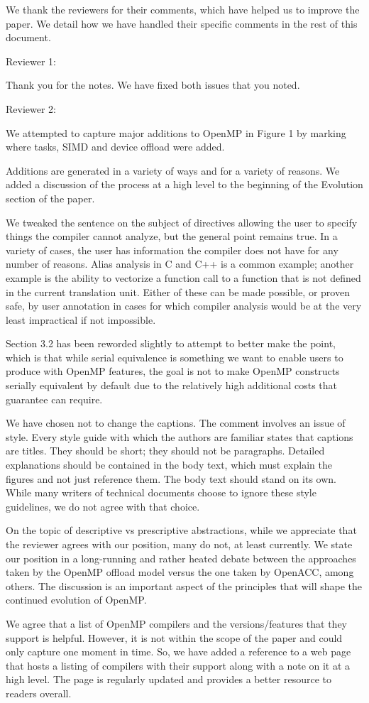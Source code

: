 \documentclass[]{article}
\date{}
\begin{document}
We thank the reviewers for their comments, which have helped us to
improve the paper. We detail how we have handled their specific comments
in the rest of this document.

Reviewer 1:

Thank you for the notes. We have fixed both issues that you noted.

Reviewer 2:

We attempted to capture major additions to OpenMP in Figure 1 by marking
where tasks, SIMD and device offload were added.

Additions are generated in a variety of ways and for a variety of
reasons. We added a discussion of the process at a high level to the
beginning of the Evolution section of the paper.

We tweaked the sentence on the subject of directives allowing the user
to specify things the compiler cannot analyze, but the general point
remains true. In a variety of cases, the user has information the
compiler does not have for any number of reasons. Alias analysis in C
and C++ is a common example; another example is the ability to vectorize
a function call to a function that is not defined in the current
translation unit. Either of these can be made possible, or proven safe,
by user annotation in cases for which compiler analysis would be at the
very least impractical if not impossible.

Section 3.2 has been reworded slightly to attempt to better make the
point, which is that while serial equivalence is something we want to
enable users to produce with OpenMP features, the goal is not to make
OpenMP constructs serially equivalent by default due to the relatively
high additional costs that guarantee can require.

We have chosen not to change the captions. The comment involves an issue
of style. Every style guide with which the authors are familiar states
that captions are titles. They should be short; they should not be
paragraphs. Detailed explanations should be contained in the body text,
which must explain the figures and not just reference them. The body
text should stand on its own. While many writers of technical documents
choose to ignore these style guidelines, we do not agree with that
choice.

On the topic of descriptive vs prescriptive abstractions, while we
appreciate that the reviewer agrees with our position, many do not, at
least currently. We state our position in a long-running and rather
heated debate between the approaches taken by the OpenMP offload model
versus the one taken by OpenACC, among others. The discussion is an
important aspect of the principles that will shape the continued
evolution of OpenMP.

We agree that a list of OpenMP compilers and the versions/features that
they support is helpful. However, it is not within the scope of the
paper and could only capture one moment in time. So, we have added a
reference to a web page that hosts a listing of compilers with their
support along with a note on it at a high level. The page is regularly
updated and provides a better resource to readers overall.
\end{document}
